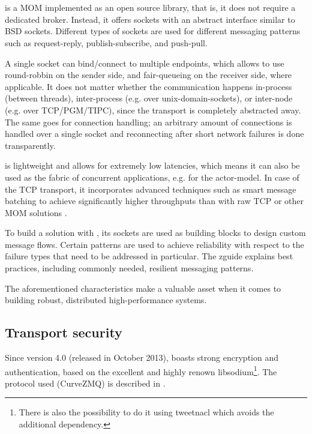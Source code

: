 \chapter{\zmq}\label{ch:zmq}
\zmq is a \gls{MOM} implemented as an open source library, that is, it does not
require a dedicated broker. Instead, it offers sockets with an abstract
interface similar to \acrshort{BSD} sockets. Different types of sockets are used for
different messaging patterns such as request-reply, publish-subscribe, and
push-pull.

A single socket can bind/connect to multiple endpoints, which allows \zmq to
use round-robbin on the sender side, and fair-queueing on the receiver side,
where applicable. It does not matter whether the communication happens
in-process (between threads), inter-process (e.g. over \glspl{unix-domain-socket}), or
inter-node (e.g. over \acrshort{TCP}/\acrshort{PGM}/\acrshort{TIPC}), since the transport is completely
abstracted away. The same goes for connection handling; an arbitrary amount of
connections is handled over a single socket and reconnecting after short
network failures is done transparently.

\zmq is lightweight and allows for extremely low latencies, which means it can
also be used as the fabric of concurrent applications, e.g. for the \gls{actor-model}.
In case of the TCP transport, it incorporates advanced techniques such
as smart message batching to achieve significantly higher throughputs than with
raw TCP or other \gls{MOM} solutions \cite[Figure 2, Middleware evaluation and
prototyping, p.~4]{cern:new-cmw}.

To build a solution with \zmq, its sockets are used as building blocks to
design custom message flows. Certain patterns are used to achieve reliability
with respect to the failure types that need to be addressed in particular.  The
\gls{zguide} explains best practices, including commonly needed, resilient
messaging patterns.

The aforementioned characteristics make \zmq a valuable asset when it comes to building
robust, distributed high-performance systems.

\section{Transport security}\label{sec:zmq:security}
Since version 4.0 (released in October 2013), \zmq boasts strong encryption and
authentication, based on the excellent and highly renown
\gls{libsodium}\footnote{There is also the possibility to do it using
\gls{tweetnacl} which avoids the additional dependency.}. The protocol used
(CurveZMQ) is described in \cite{zmq:curvezmq}.


